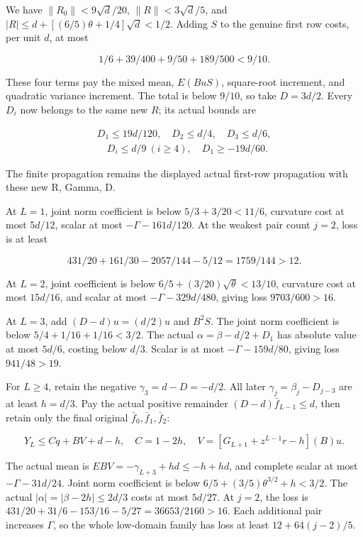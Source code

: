 We have \(\|R_0\|<9\sqrt d/20\), \(\|R\|<3\sqrt d/5\), and \(|R|\le d+[(6/5)\theta+1/4]\sqrt d<1/2\). Adding \(S\) to the genuine first row costs, per unit \(d\), at most

\[
1/6+39/400+9/50+189/500<9/10.
\]

These four terms pay the mixed mean, \(E(BuS)\), square-root increment, and quadratic variance increment. The total is below \(9/10\), so take \(D=3d/2\). Every \(D_i\) now belongs to the same new \(R\); its actual bounds are

\[
\begin{gathered}
D_1\le19d/120,\quad D_2\le d/4,\quad D_3\le d/6,\\
\quad D_i\le d/9\ (i\ge4),\quad D_1\ge-19d/60.
\end{gathered}\tag{C181.T190.29}
\]

The finite propagation remains the displayed actual first-row propagation with these new R, Gamma, D.

At \(L=1\), joint norm coefficient is below \(5/3+3/20<11/6\), curvature cost at most \(5d/12\), scalar at most \(-\Gamma-161d/120\). At the weakest pair count \(j=2\), loss is at least

\[
431/20+161/30-2057/144-5/12=1759/144>12.
\]

At \(L=2\), joint coefficient is below \(6/5+(3/20)\sqrt\theta<13/10\), curvature cost at most \(15d/16\), and scalar at most \(-\Gamma-329d/480\), giving loss \(9703/600>16\).

At \(L=3\), add \((D-d)u=(d/2)u\) and \(B^2S\). The joint norm coefficient is below \(5/4+1/16+1/16<3/2\). The actual \(\alpha=\beta-d/2+D_1\) has absolute value at most \(5d/6\), costing below \(d/3\). Scalar is at most \(-\Gamma-159d/80\), giving loss \(941/48>19\).

For \(L\ge4\), retain the negative \(\gamma_3=d-D=-d/2\). All later \(\gamma_j=\beta_j-D_{j-3}\) are at least \(h=d/3\). Pay the actual positive remainder \((D-d)\bar f_{L-1}\le d\), then retain only the final original \(\bar f_0,\allowbreak \allowbreak  \bar f_1,\allowbreak \allowbreak  \bar f_2\):

\[
Y_L\le Cq+BV+d-h,\quad C=1-2h,
\quad V=[G_{L+1}+z^{L-1}r-h](B)u.
\]

The actual mean is \(EBV=-\gamma_{L+3}+hd\le-h+hd\), and complete scalar at most \(-\Gamma-31d/24\). Joint norm coefficient is below \(6/5+(3/5)\theta^{3/2}+h<3/2\). The actual \(|\alpha|=|\beta-2h|\le2d/3\) costs at most \(5d/27\). At \(j=2\), the loss is \(431/20+31/6-153/16-5/27=36653/2160>16\). Each additional pair increases \(\Gamma\), so the whole low-domain family has loss at least \(12+64(j-2)/5\).


